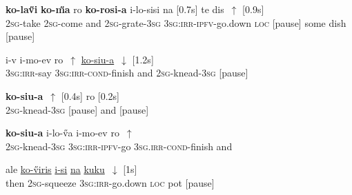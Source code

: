\documentclass[output=paper]{LSP/langsci}
\begin{document}
  \begin{exe}
\ex \label{Guapp8}
\gll    \textbf{ko-la\H{v}i}      \textbf{ko-\H{m}a} ro      \textbf{ko-rosi-a}  i-lo-sisi                 na  [0.7s] te dis~$\uparrow$ [0.9s]\\     	       
 \textsc{2sg}-take   \textsc{2sg}-come  and \textsc{2sg}-grate-\textsc{3sg} \textsc{3sg:irr-ipfv}-go.down   \textsc{loc} [pause] some dish [pause]\\
\glt {} 
\end{exe}

  \begin{exe}
\ex \label{Guapp9}
\gll  i-v             i-mo-ev                  ro~$\uparrow$     \underline{ko-siu-a}~$\downarrow$  [1.2s]  \\     	       
 \textsc{3sg:irr}-say   \textsc{3sg:irr-cond}-finish   and   \textsc{2sg}-knead-\textsc{3sg}  [pause]\\
\glt {} 
\end{exe}

  \begin{exe}
\ex \label{Guapp10}
\gll  \textbf{ko-siu-a}~$\uparrow$  [0.4s] ro [0.2s] \\     	       
\textsc{2sg}-knead-\textsc{3sg} [pause]  and [pause]\\
\glt {} 
\end{exe}


  \begin{exe}
\ex \label{Guapp11}
\gll  \textbf{ko-siu-a} i-lo-\H{v}a                  i-mo-ev                  ro~$\uparrow$   \\     	       
\textsc{2sg}-knead-\textsc{3sg} \textsc{3sg:irr-ipfv}-go     \textsc{3sg.irr-cond}-finish   and  \\
\glt {} 
\end{exe}

  \begin{exe}
\ex \label{Guapp12}
\gll  ale    \underline{ko-\H{v}iris}          \underline{i-si}                 \underline{na}   \underline{kuku}~$\downarrow$  [1s]\\     	       
then   \textsc{2sg}-squeeze     \textsc{3sg:irr-}go.down   \textsc{loc}  pot  [pause]\\
\glt {} 
\end{exe}
\end{document}
